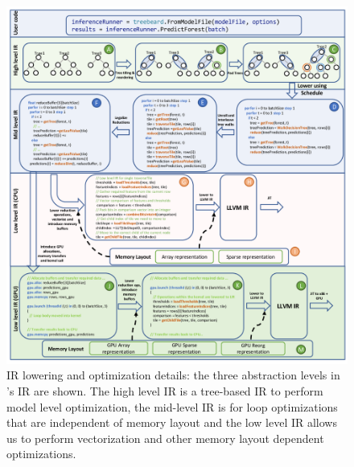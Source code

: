 \begin{figure}[htb]
  \centering
  \includegraphics[width=\linewidth]{figures/OverviewExample_New.png}
  \vskip 10pt
  \caption{\Treebeard{} IR lowering and optimization details: the three abstraction levels in \Treebeard{}'s IR are shown. The
           high level IR is a tree-based IR to perform model level optimization, the mid-level IR is for
           loop optimizations that are independent of memory layout and the low level IR allows us to perform
           vectorization and other memory layout dependent optimizations.}
  \label{Fig:LoweringExample}
\end{figure}

